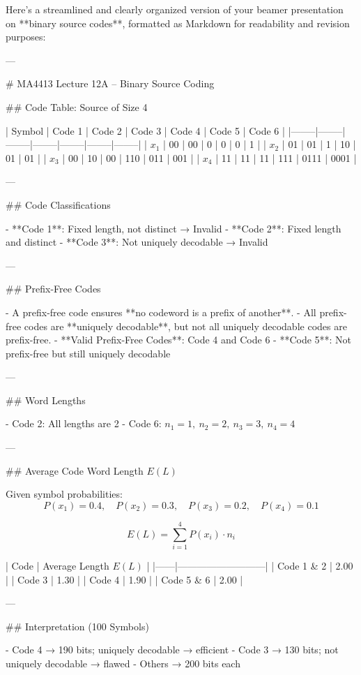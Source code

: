 Here’s a streamlined and clearly organized version of your beamer presentation on **binary source codes**, formatted as Markdown for readability and revision purposes:

---

# MA4413 Lecture 12A – Binary Source Coding

## Code Table: Source of Size 4

| Symbol | Code 1 | Code 2 | Code 3 | Code 4 | Code 5 | Code 6 |
|--------|--------|--------|--------|--------|--------|--------|
| \( x_1 \) | 00     | 00     | 0      | 0      | 0      | 1      |
| \( x_2 \) | 01     | 01     | 1      | 10     | 01     | 01     |
| \( x_3 \) | 00     | 10     | 00     | 110    | 011    | 001    |
| \( x_4 \) | 11     | 11     | 11     | 111    | 0111   | 0001   |

---

## Code Classifications

- **Code 1**: Fixed length, not distinct → Invalid  
- **Code 2**: Fixed length and distinct  
- **Code 3**: Not uniquely decodable → Invalid  

---

## Prefix-Free Codes

- A prefix-free code ensures **no codeword is a prefix of another**.
- All prefix-free codes are **uniquely decodable**, but not all uniquely decodable codes are prefix-free.
- **Valid Prefix-Free Codes**: Code 4 and Code 6  
- **Code 5**: Not prefix-free but still uniquely decodable

---

## Word Lengths

- Code 2: All lengths are 2  
- Code 6: \( n_1 = 1,\ n_2 = 2,\ n_3 = 3,\ n_4 = 4 \)

---

## Average Code Word Length \( E(L) \)

Given symbol probabilities:  
\[
P(x_1) = 0.4,\quad P(x_2) = 0.3,\quad P(x_3) = 0.2,\quad P(x_4) = 0.1
\]

\[
E(L) = \sum_{i=1}^{4} P(x_i) \cdot n_i
\]

| Code | Average Length \( E(L) \) |
|------|---------------------------|
| Code 1 & 2 | 2.00 |
| Code 3 | 1.30 |
| Code 4 | 1.90 |
| Code 5 & 6 | 2.00 |

---

## Interpretation (100 Symbols)

- Code 4 → 190 bits; uniquely decodable → efficient  
- Code 3 → 130 bits; not uniquely decodable → flawed  
- Others → 200 bits each

